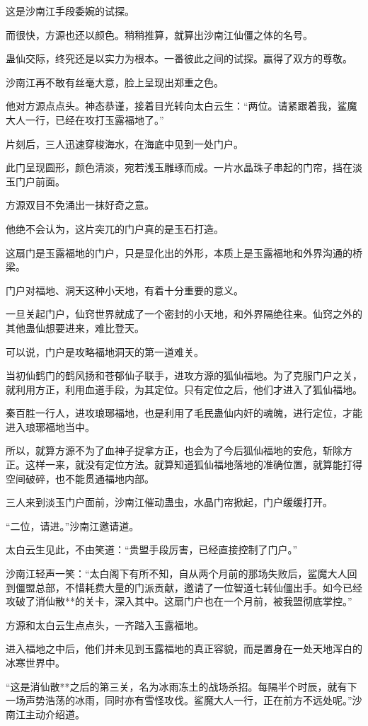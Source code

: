 \begin{this_body}
这是沙南江手段委婉的试探。

而很快，方源也还以颜色。稍稍推算，就算出沙南江仙僵之体的名号。

蛊仙交际，终究还是以实力为根本。一番彼此之间的试探。赢得了双方的尊敬。

沙南江再不敢有丝毫大意，脸上呈现出郑重之色。

他对方源点点头。神态恭谨，接着目光转向太白云生：“两位。请紧跟着我，鲨魔大人一行，已经在攻打玉露福地了。”

片刻后，三人迅速穿梭海水，在海底中见到一处门户。

此门呈现圆形，颜色清淡，宛若浅玉雕琢而成。一片水晶珠子串起的门帘，挡在淡玉门户前面。

方源双目不免涌出一抹好奇之意。

他绝不会认为，这片突兀的门户真的是玉石打造。

这扇门是玉露福地的门户，只是显化出的外形，本质上是玉露福地和外界沟通的桥梁。

门户对福地、洞天这种小天地，有着十分重要的意义。

一旦关起门户，仙窍世界就成了一个密封的小天地，和外界隔绝往来。仙窍之外的其他蛊仙想要进来，难比登天。

可以说，门户是攻略福地洞天的第一道难关。

当初仙鹤门的鹤风扬和苍郁仙子联手，进攻方源的狐仙福地。为了克服门户之关，就利用方正，利用血道手段，为其定位。只有定位之后，他们才进入了狐仙福地。

秦百胜一行人，进攻琅琊福地，也是利用了毛民蛊仙内奸的魂魄，进行定位，才能进入琅琊福地当中。

所以，就算方源不为了血神子捉拿方正，也会为了今后狐仙福地的安危，斩除方正。这样一来，就没有定位方法。就算知道狐仙福地落地的准确位置，就算能打得空间破碎，也不能贯通福地内部。

三人来到淡玉门户面前，沙南江催动蛊虫，水晶门帘掀起，门户缓缓打开。

“二位，请进。”沙南江邀请道。

太白云生见此，不由笑道：“贵盟手段厉害，已经直接控制了门户。”

沙南江轻声一笑：“太白阁下有所不知，自从两个月前的那场失败后，鲨魔大人回到僵盟总部，不惜耗费大量的门派贡献，邀请了一位智道七转仙僵出手。如今已经攻破了消仙散**的关卡，深入其中。这扇门户也在一个月前，被我盟彻底掌控。”

方源和太白云生点点头，一齐踏入玉露福地。

进入福地之中后，他们并未见到玉露福地的真正容貌，而是置身在一处天地浑白的冰寒世界中。

“这是消仙散**之后的第三关，名为冰雨冻土的战场杀招。每隔半个时辰，就有下一场声势浩荡的冰雨，同时亦有雪怪攻伐。鲨魔大人一行，正在前方不远处呢。”沙南江主动介绍道。


\end{this_body}
